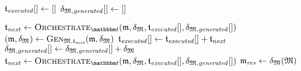 \begin{algorithmic}[1]
        \algindentskip
            \State \Return{$\bot$}
        \EndIf
        \algblockskip

        \State $\applyalgexecuted \gets \sequenced{}$
        \State $\applyalggenerated \gets \sequenced{}$
        \algblockskip

        \State $\transformation{t}_\mathvariable{next} \gets \function{Orchestrate}_{\transformationset{T}}(\modeltuple{m}, \changetuple{\metamodeltuple{M}}, \applyalgexecuted, \applyalggenerated)$ \label{algo:orchestration:application:line:startorchestrate}
            \State $(\modeltuple{m}, \changetuple{\metamodeltuple{M}}) \gets \generalizationfunction{\metamodeltuple{M}, \transformation{t}_\mathvariable{next}}(\modeltuple{m}, \changetuple{\metamodeltuple{M}})$ \label{algo:orchestration:application:line:stepcalculation}
            \State $\applyalgexecuted \gets \applyalgexecuted + \transformation{t}_\mathvariable{next}$
            \State $\applyalggenerated \gets \applyalggenerated + \changetuple{\metamodeltuple{M}}$
            \State $\transformation{t}_\mathvariable{next} \gets \function{Orchestrate}_{\transformationset{T}}(\modeltuple{m}, \changetuple{\metamodeltuple{M}}, \applyalgexecuted, \applyalggenerated)$
        \EndWhile \label{algo:orchestration:application:line:endorchestrate}
        \State $\modeltuple{m}_\mathvariable{res} \gets \changetuple{\metamodeltuple{M}}(\metamodeltuple{m})$
        \algblockskip
        
         \label{algo:orchestration:application:line:startconsistencycheck}
            \State \Return{$\bot$}
        \EndIf \label{algo:orchestration:application:line:endconsistencycheck}
        \algblockskip

        \State {} \label{algo:orchestration:application:line:returnresult}
        \algindentskip
    \EndProcedure
\end{algorithmic}